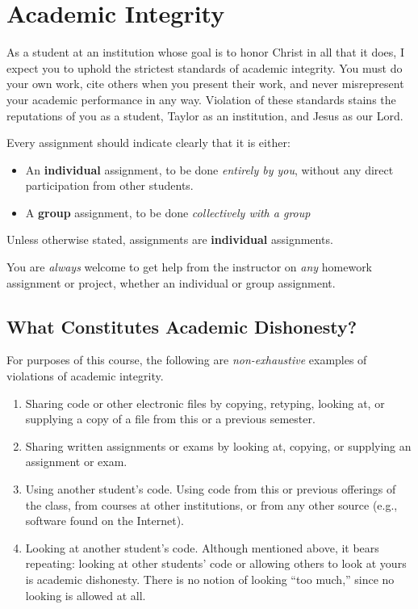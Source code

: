 \section{Academic Integrity}

As a student at an institution whose goal is to honor Christ in all that it does,
I expect you to uphold the strictest standards of academic integrity.
You must do your own work,
cite others when you present their work,
and never misrepresent your academic performance in any way.
Violation of these standards stains the reputations of you as a student,
Taylor as an institution,
and Jesus as our Lord.

Every assignment should indicate clearly
that it is either:
\begin{itemize}
\item An \textbf{individual} assignment,
  to be done \emph{entirely by you},
  without any direct participation from other students.
\item A \textbf{group} assignment, to be done \emph{collectively with a group}
\end{itemize}
Unless otherwise stated,
assignments are \textbf{individual} assignments.

\begin{flushleft}
  \begin{framed}
    You are \emph{always} welcome
    to get help from the instructor on \emph{any}
    homework assignment or project,
    whether an individual or group assignment.
  \end{framed}
\end{flushleft}

\subsection{What Constitutes Academic Dishonesty?}
\label{sec:what-is}

For purposes of this course, the following are \emph{non-exhaustive} examples
of violations of academic integrity.
\begin{enumerate}
\item
  Sharing code or other electronic files by copying, retyping, looking at,
  or supplying a copy of a file from this or a previous semester. 
\item
  Sharing written assignments or exams by looking at, copying, or supplying
  an assignment or exam.
\item
  Using another student's code. Using code from this or previous offerings of the
  class, from courses at other institutions, or from any other source (e.g.,
  software found on the Internet).
\item\label{i:looking}
  Looking at another student's code. Although mentioned above, it bears
  repeating: looking at other students' code or allowing others to look at yours
  is academic dishonesty. There is no notion of looking ``too much,'' since no looking is
  allowed at all.
\end{enumerate}

